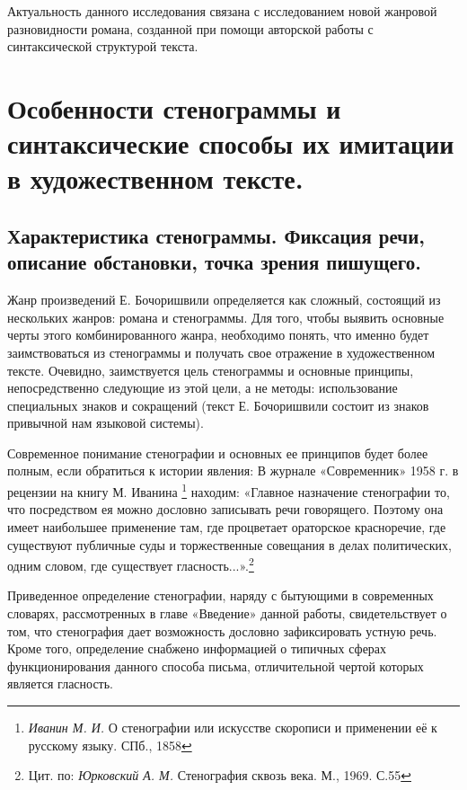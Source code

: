 \documentclass{kursa4}
\begin{document}
    Актуальность данного исследования связана с исследованием новой жанровой разновидности романа, созданной при помощи авторской работы с синтаксической структурой текста. 

  \setcounter{chapter}{0}
  \chapter {Особенности стенограммы и синтаксические способы их имитации в художественном тексте.}

    \section {Характеристика стенограммы. Фиксация речи, описание обстановки, точка зрения пишущего.}

      Жанр произведений Е. Бочоришвили определяется как сложный, состоящий из нескольких жанров: романа и стенограммы. Для того, чтобы выявить основные черты этого комбинированного жанра, необходимо понять, что именно будет заимствоваться из стенограммы и получать свое отражение в художественном тексте. Очевидно, заимствуется цель стенограммы и основные принципы, непосредственно следующие из этой цели, а не методы: использование специальных знаков и сокращений (текст Е. Бочоришвили состоит из знаков привычной нам языковой системы). 

      Современное понимание стенографии и основных ее принципов будет более полным, если обратиться к истории явления: В журнале «Современник» 1958 г. в рецензии на книгу М. Иванина \footnote{\textit{Иванин М. И. }О стенографии или искусстве скорописи и применении её к русскому языку. СПб., 1858} находим: «Главное назначение стенографии то, что посредством ея можно дословно записывать речи говорящего. Поэтому она имеет наибольшее применение там, где процветает ораторское красноречие, где существуют публичные суды и торжественные совещания в делах политических, одним словом, где существует гласность...».\footnote{{ Цит. по: }\textit{{Юрковский А. М.
      }}{Стенография сквозь века. М., 1969. С.55}}{ }

       Приведенное определение стенографии, наряду с бытующими в современных словарях, рассмотренных в главе «Введение» данной работы, свидетельствует о том, что стенография дает возможность дословно зафиксировать устную речь. Кроме того, определение снабжено информацией о типичных сферах функционирования данного способа письма, отличительной чертой которых является гласность. 
\end{document}
